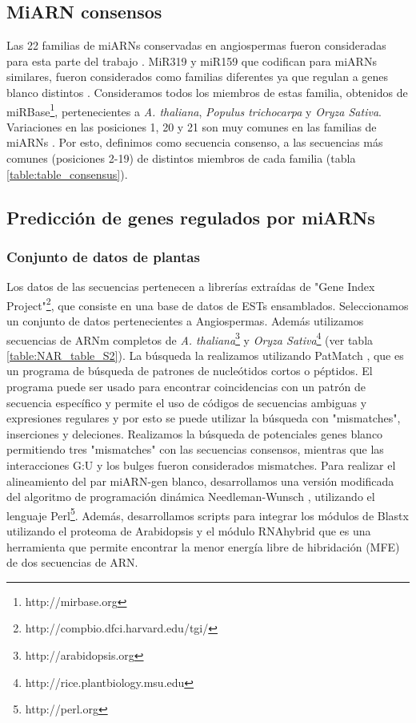 \subsection{MiARN consensos}
Las 22 familias de miARNs conservadas en angiospermas fueron consideradas para esta parte del trabajo \citep{Fahlgren2010,Axtell2008343}.
MiR319 y miR159 que codifican para miARNs similares, fueron considerados como familias diferentes ya que regulan a genes blanco distintos \citep{Palatnik2007}.
Consideramos todos los miembros de estas familia, obtenidos de miRBase\footnote{http://mirbase.org}, pertenecientes a \textit{A. thaliana}, \textit{Populus trichocarpa} y \textit{Oryza Sativa}.
Variaciones en las posiciones 1, 20 y 21 son muy comunes en las familias de miARNs \citep{10.1371/journal.pgen.1002419}. 
Por esto, definimos como secuencia consenso, a las secuencias más comunes (posiciones 2-19) de distintos miembros de cada familia (tabla \ref{table:table_consensus}).

\subsection{Predicción de genes regulados por miARNs}

\subsubsection{Conjunto de datos de plantas}
Los datos de las secuencias pertenecen a librerías extraídas de "Gene Index Project"\footnote{http://compbio.dfci.harvard.edu/tgi/}, que consiste en una base de datos de ESTs ensamblados.
Seleccionamos un conjunto de datos pertenecientes a Angiospermas.
Además utilizamos secuencias de ARNm completos de \textit{A. thaliana}\footnote{http://arabidopsis.org} y \textit{Oryza Sativa}\footnote{http://rice.plantbiology.msu.edu} (ver tabla \ref{table:NAR_table_S2}).
La búsqueda la realizamos utilizando PatMatch \citep{Yan01072005}, que es un programa de búsqueda de patrones de nucleótidos cortos o péptidos.
El programa puede ser usado para encontrar coincidencias con un patrón de secuencia específico y permite el uso de códigos de secuencias ambiguas y expresiones regulares y por esto se puede utilizar la búsqueda con "mismatches", inserciones y deleciones.
Realizamos la búsqueda de potenciales genes blanco permitiendo tres "mismatches" con las secuencias consensos, mientras que las interacciones G:U y los bulges fueron considerados mismatches.
Para realizar el alineamiento del par miARN-gen blanco, desarrollamos una versión modificada del algoritmo de programación dinámica Needleman-Wunsch \citep{Needleman1970443}, utilizando el lenguaje Perl\footnote{http://perl.org}.
Además, desarrollamos scripts para integrar los módulos de Blastx \citep{Altschup1990} utilizando el proteoma de Arabidopsis y el módulo RNAhybrid \citep{Giegerich2004} que es una herramienta que permite encontrar la menor energía libre de hibridación (MFE) de dos secuencias de ARN.

